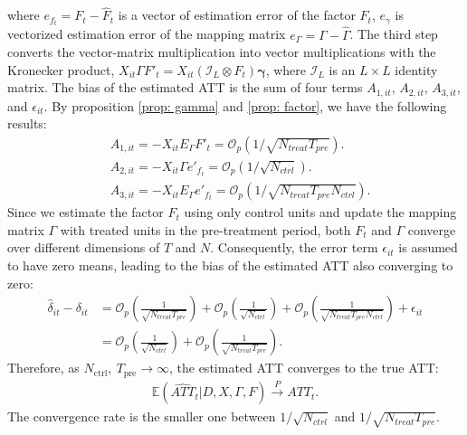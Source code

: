\documentclass[12pt]{article}
\begin{document}
\noindent where $e_{f_t} = F_t - \hat{F}_t$ is a vector of estimation error of the factor $F_t$, $e_{\gamma}$ is vectorized estimation error of the mapping matrix $e_{\Gamma} = \Gamma - \hat{\Gamma}$. The third step converts the vector-matrix multiplication into vector multiplications with the Kronecker product, $X_{it}\Gamma F'_t = X_{it}(\mathcal{I}_L \otimes F_t)\bm{\gamma}$, where $\mathcal{I}_L$ is an $L \times L$ identity matrix. The bias of the estimated ATT is the sum of four terms $A_{1,it}$, $A_{2,it}$, $A_{3,it}$, and $\epsilon_{it}$. By proposition \ref{prop: gamma} and \ref{prop: factor}, we have the following results:
\begin{equation*}
\begin{aligned}
    &A_{1,it} = -X_{it}E_{\Gamma} F'_t = \mathcal{O}_p\left(1/\sqrt{N_{treat}T_{pre}}\right). \\
    &A_{2,it} = -X_{it}\Gamma e'_{f_t} = \mathcal{O}_p\left(1/\sqrt{N_{ctrl}}\right). \\
    &A_{3,it} = -X_{it}E_{\Gamma} e'_{f_t} = \mathcal{O}_p\left(1/\sqrt{N_{treat}T_{pre}N_{ctrl}}\right).
\end{aligned}
\end{equation*}
Since we estimate the factor $F_t$ using only control units and update the mapping matrix $\Gamma$ with treated units in the pre-treatment period, both $F_t$ and $\Gamma$ converge over different dimensions of $T$ and $N$. Consequently, the error term $\epsilon_{it}$ is assumed to have zero means, leading to the bias of the estimated ATT also converging to zero:
\begin{equation*}
\begin{aligned}
    \hat{\delta}_{it} - \delta_{it} &= \mathcal{O}_p\left(\frac{1}{\sqrt{N_{treat}T_{pre}}}\right) + \mathcal{O}_p\left(\frac{1}{\sqrt{N_{ctrl}}}\right) + \mathcal{O}_p\left(\frac{1}{\sqrt{N_{treat}T_{pre}N_{ctrl}}}\right) + \epsilon_{it} \\
    &= \mathcal{O}_p\left(\frac{1}{\sqrt{N_{ctrl}}} \right) + \mathcal{O}_p\left(\frac{1}{\sqrt{N_{treat}T_{pre}}} \right).
\end{aligned}
\end{equation*}
Therefore, as $N_{\text{ctrl}}, \ T_{\text{pre}} \to \infty$, the estimated ATT converges to the true ATT:
\begin{equation*}
\begin{aligned}
    \mathbb{E}\left(\widehat{ATT}_{t} | D, X, \Gamma, F\right) \xrightarrow{P} ATT_{t}.
\end{aligned}
\end{equation*}
The convergence rate is the smaller one between $1/\sqrt{N_{ctrl}}$ and $1/\sqrt{N_{treat}T_{pre}}$.
\end{document}

